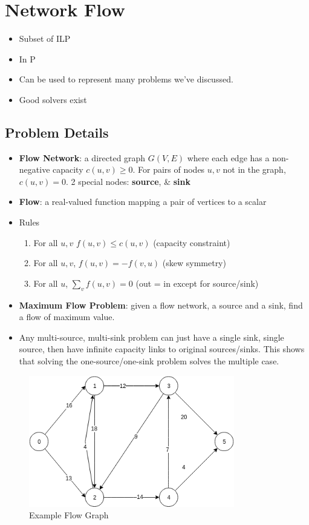 \documentclass[12pt, letter]{article}
\begin{document}
\section{Network Flow}%
\label{sec:network_flow}
\begin{itemize}
	\item Subset of ILP
	\item In P
	\item Can be used to represent many problems we've discussed.
	\item Good solvers exist
\end{itemize}

\subsection*{Problem Details}
\begin{itemize}
	\item \textbf{Flow Network}: a directed graph $G(V,E)$ where each edge has a non-negative capacity $c(u,v) \ge 0$. For pairs of nodes $u,v$ not in the graph, $c(u,v) = 0$. 2 special nodes:  \textbf{source}, \& \textbf{sink} 
	\item \textbf{Flow}: a real-valued function mapping a pair of vertices to a scalar
	\item Rules
	\begin{enumerate}
		\item For all $u,v$ $f(u,v) \le c(u,v)$ (capacity constraint)
		\item For all $u,v$, $f(u,v) = -f(v,u)$ (skew symmetry)
		\item For all $u$, $\sum_v f(u,v)=0$ (out = in except for source/sink)
	\end{enumerate}
	\item \textbf{Maximum Flow Problem}: given a flow network, a source and a sink, find a flow of maximum value.
	\item Any multi-source, multi-sink problem can just have a single sink, single source, then have infinite capacity links to original sources/sinks. This shows that solving the one-source/one-sink problem solves the multiple case.
\end{itemize}

\begin{figure}[h]
	\centering
	\includegraphics[width=0.8\textwidth]{flow}
	\caption{Example Flow Graph}
	\label{fig:flow}
\end{figure}
\end{document}
